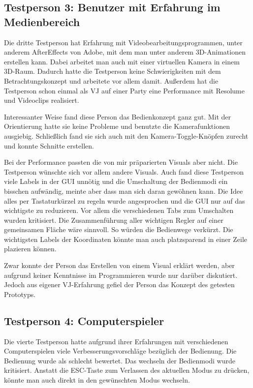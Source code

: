 \subsection{Testperson 3: Benutzer mit Erfahrung im Medienbereich}

Die dritte Testperson hat Erfahrung mit Videobearbeitungsprogrammen, unter anderem AfterEffects von Adobe, mit dem man
unter anderem 3D-Animationen erstellen kann. Dabei arbeitet man auch mit einer virtuellen Kamera in einem 3D-Raum. 
Dadurch hatte die Testperson keine Schwierigkeiten mit dem Betrachtungskonzept und arbeitete vor allem damit.
Au\ss{}erdem hat die Testperson schon einmal als VJ auf einer Party eine Performance mit Resolume und Videoclips realisiert.

Interessanter Weise fand diese Person das Bedienkonzept ganz gut. Mit der Orientierung hatte sie keine Probleme und
benutzte die Kamerafunktionen ausgiebig. Schlie\ss{}lich fand sie sich auch mit den Kamera-Toggle-Kn\"opfen zurecht und 
konnte Schnitte erstellen.

Bei der Performance passten die von mir pr\"aparierten Visuals aber nicht. Die Testperson w\"unschte sich vor allem andere
Visuals. Auch fand diese Testperson viele Labels in der GUI unn\"otig und die Umschaltung der Bedienmodi ein bisschen 
aufw\"andig, meinte aber dass man sich daran gew\"ohnen kann. Die Idee alles per Tastaturk\"urzel zu regeln wurde
angesprochen und die GUI nur auf das wichtigste zu reduzieren. Vor allem die verschiedenen Tabs zum Umschalten wurden 
kritisiert. Die Zusammenf\"uhrung aller wichtigen Regler auf einer gemeinsamen Fl\"ache w\"are sinnvoll. So w\"urden 
die Bedienwege verk\"urzt. Die wichtigsten Labels der Koordinaten k\"onnte man auch platzsparend in einer Zeile plazieren
k\"onnen.

Zwar konnte der Person das Erstellen von einem Visual erkl\"art werden, aber aufgrund keiner Kenntnisse im Programmieren
wurde nur dar\"uber diskutiert. Jedoch aus eigener VJ-Erfahrung gefiel der Person das Konzept des getesten Prototyps.

\subsection{Testperson 4: Computerspieler}

Die vierte Testperson hatte aufgrund ihrer Erfahrungen mit verschiedenen Computerspielen viele Verbesserungsvorschl\"age
bez\"uglich der Bedienung. Die Bedienung wurde als schlecht bewertet. Das wechseln der Bedienmodi wurde kritisiert. Anstatt
die ESC-Taste zum Verlassen des aktuellen Modus zu dr\"ucken, k\"onnte man auch direkt in den gew\"unschten Modus wechseln.

